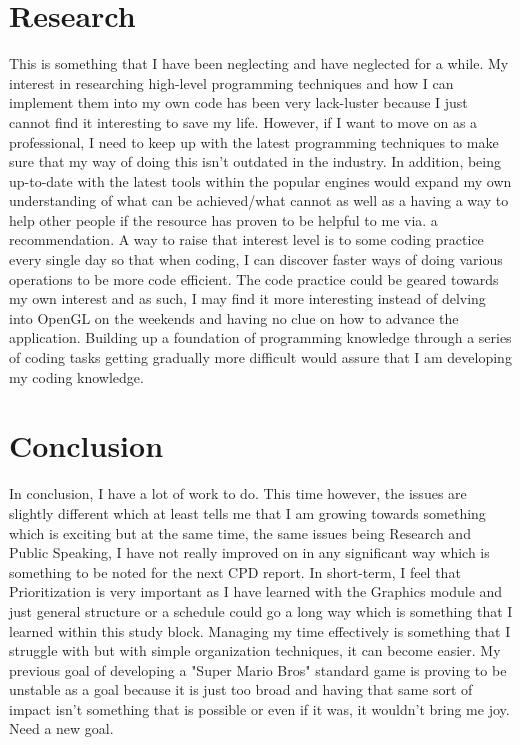 \documentclass{scrartcl}
\begin{document}
\section{Research}
This is something that I have been neglecting and have neglected for a while. My interest in researching high-level programming techniques and how I can implement them into my own code has
been very lack-luster because I just cannot find it interesting to save my life. However, if I want
to move on as a professional, I need to keep up with the latest programming techniques to make sure
that my way of doing this isn't outdated in the industry. In addition, being up-to-date with the latest tools within the popular engines would expand my own understanding of what can be achieved/what cannot as well as a having a way to help other people if the resource has proven to be helpful to me via. a recommendation. A way to raise that interest level is to some coding practice every single day so that when coding, I can discover faster ways of doing various operations to be more code efficient. The code practice could be geared towards my own interest and as such, I may find it more interesting instead of delving into OpenGL on the weekends and having no clue on how to advance the application. Building up a foundation of programming knowledge through a series of coding tasks getting gradually more difficult would assure that I am developing my coding knowledge.


\section{Conclusion}
In conclusion, I have a lot of work to do. This time however, the issues are slightly different which at least tells me that I am growing towards something which is exciting but at the same time, the same issues being Research and Public Speaking, I have not really improved on in any significant way which is something to be noted for the next CPD report. In short-term, I feel that Prioritization is very important as I have learned with the Graphics module and just general structure or a schedule could go a long way which is something that I learned within this study block. Managing my time effectively is something that I struggle with but with simple organization techniques, it can become easier. My previous goal of developing a "Super Mario Bros" standard game is proving to be unstable as a goal because it is just too broad and having that same sort of impact isn't something that is possible or even if it was, it wouldn't bring me joy. Need a new goal.
\end{document}
